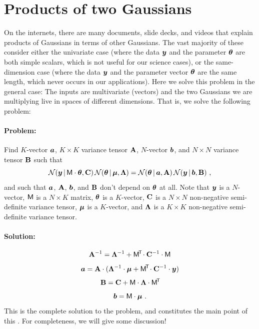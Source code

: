 \section{Products of two Gaussians}\label{sec:problemsolution}

On the internets, there are many documents, slide decks, and videos
that explain products of Gaussians in terms of other Gaussians.
The vast majority of these consider either the univariate case (where
the data $\boldsymbol{y}$ and the parameter $\boldsymbol{\theta}$ are both simple scalars, which
is not useful for our science cases), or the same-dimension case (where the data
$\boldsymbol{y}$ and the parameter vector $\boldsymbol{\theta}$ are the same length, which never
occurs in our applications).
Here we solve this problem in the general case:
The inputs are multivariate (vectors) and the two Gaussians we are
multiplying live in spaces of different dimensions.
That is, we solve the following problem:

\paragraph{Problem:}
Find $K$-vector $\boldsymbol{a}$, $K\times K$ variance tensor $\mathbf{A}$, $N$-vector $\boldsymbol{b}$,
and $N\times N$ variance tensor $\mathbf{B}$ such that
\begin{equation}\label{eq:problem}
\mathcal{N}\!\,(\boldsymbol{y}\,|\,\mathsf{M}\cdot\boldsymbol{\theta},\mathbf{C})\,\mathcal{N}\!\,(\boldsymbol{\theta}\,|\,\boldsymbol{\mu},\mathbf{\Lambda})
 = \mathcal{N}\!\,(\boldsymbol{\theta}\,|\,\boldsymbol{a},\mathbf{A})\,\mathcal{N}\!\,(\boldsymbol{y}\,|\,\boldsymbol{b},\mathbf{B}) ~,
\end{equation}
and such that $\boldsymbol{a}$, $\mathbf{A}$, $\boldsymbol{b}$, and $\mathbf{B}$ don't depend on $\boldsymbol{\theta}$ at all.
Note that
$\boldsymbol{y}$ is a $N$-vector,
$\mathsf{M}$ is a $N\times K$ matrix,
$\boldsymbol{\theta}$ is a $K$-vector,
$\mathbf{C}$ is a $N\times N$ non-negative semi-definite variance tensor,
$\boldsymbol{\mu}$ is a $K$-vector,
and
$\mathbf{\Lambda}$ is a $K\times K$ non-negative semi-definite variance tensor.

\paragraph{Solution:}
\begin{equation}\label{eq:A}
\mathbf{A}^{-1} = \mathbf{\Lambda}^{-1} + \mathsf{M}^{\!\mathsf{T}\!} \cdot \mathbf{C}^{-1} \cdot \mathsf{M}
\end{equation}
\begin{equation}\label{eq:a}
\boldsymbol{a} = \mathbf{A} \cdot (\mathbf{\Lambda}^{-1} \cdot \boldsymbol{\mu} + \mathsf{M}^{\!\mathsf{T}\!} \cdot \mathbf{C}^{-1} \cdot \boldsymbol{y})
\end{equation}
\begin{equation}\label{eq:B}
\mathbf{B} = \mathbf{C} + \mathsf{M} \cdot \mathbf{\Lambda} \cdot \mathsf{M}^{\!\mathsf{T}\!}
\end{equation}
\begin{equation}\label{eq:b}
\boldsymbol{b} = \mathsf{M} \cdot \boldsymbol{\mu}
~.
\end{equation}
This is the complete solution to the problem, and constitutes the main point
of this \documentname.
For completeness, we will give some discussion!

